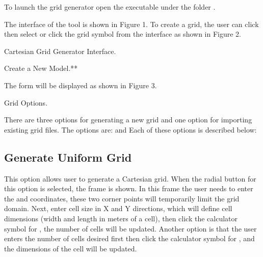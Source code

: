 \documentclass[letterpaper,10pt,english]{sphinxmanual}
\begin{document}
To launch the grid generator open the  executable under the folder .

The interface of the tool is shown in Figure 1. To create a grid, the
user can click  then select  or click the grid symbol
from the interface as shown in Figure 2.

 Cartesian Grid Generator Interface.


 Create a New Model.**

The  form will be displayed as shown in Figure 3.


 Grid Options.

There are three options for generating a new grid and one option for
importing existing grid files. The options are:  and  Each of these options is described below:


\subsection{Generate Uniform Grid}
\label{\detokenize{gridgen/uniformgrid:generate-uniform-grid}}\label{\detokenize{gridgen/uniformgrid:uniformgrid}}\label{\detokenize{gridgen/uniformgrid::doc}}
This option allows user to generate a Cartesian grid. When the radial
button for this option is selected, the  frame is
shown. In this frame the user needs to enter the  and
 coordinates, these two corner points will temporarily
limit the grid domain. Next, enter cell size in X and Y directions,
which will define cell dimensions (width and length in meters of a
cell), then click the calculator symbol for , the
number of cells will be updated. Another option is that the user enters
the number of cells desired first then click the calculator symbol for
, and the dimensions of the cell will be updated.
\end{document}
